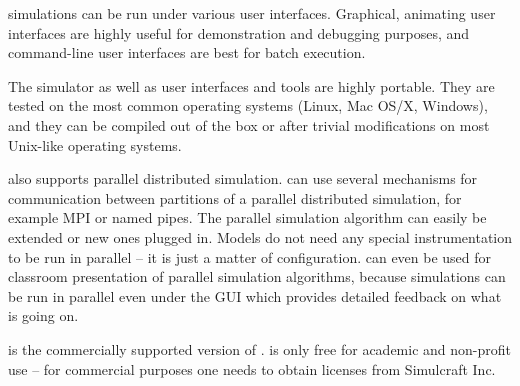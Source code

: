 {\opp} simulations can be run under various user interfaces.
Graphical, animating user interfaces are highly useful for
demonstration and debugging purposes, and command-line user
interfaces are best for batch execution.

The simulator as well as user interfaces and tools are highly portable.
They are tested on the most common operating systems (Linux, Mac OS/X,
Windows), and they can be compiled out of the box or after trivial
modifications on most Unix-like operating systems.

{\opp} also supports parallel distributed simulation. {\opp} can
use several mechanisms for communication between partitions of
a parallel distributed simulation, for example MPI or named pipes.
The parallel simulation algorithm can easily be extended or new
ones plugged in. Models do not need any special instrumentation
to be run in parallel -- it is just a matter of configuration.
{\opp} can even be used for classroom presentation of parallel
simulation algorithms, because simulations can be run in parallel
even under the GUI which provides detailed feedback on what is going on.

{\omnest} is the commercially supported version of {\omnetpp}.
{\omnetpp} is only free for academic and non-profit use --
for commercial purposes one needs to obtain {\omnest} licenses
from Simulcraft Inc.


